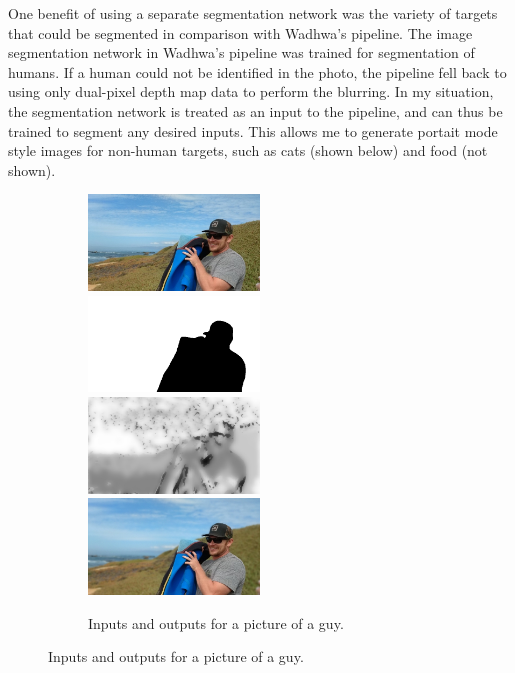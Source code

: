 \documentclass{article}
\begin{document}
One benefit of using a separate segmentation network was the variety of targets that could be segmented in comparison with Wadhwa's
pipeline.
%
The image segmentation network in Wadhwa's pipeline was trained for segmentation of humans.
%
If a human could not be identified in the photo, the pipeline fell back to using only dual-pixel depth map data to perform the
blurring.
%
In my situation, the segmentation network is treated as an input to the pipeline, and can thus be trained to segment any desired
inputs.
%
This allows me to generate portait mode style images for non-human targets, such as cats (shown below) and food (not shown).

\begin{figure}
    \begin{subfigure}{\textwidth}
        \includegraphics[width=0.5\textwidth]{../data/dude-left}
        \includegraphics[width=0.5\textwidth]{../data/dude-seg-clean}
        \includegraphics[width=0.5\textwidth]{../output/dude-depth}
        \includegraphics[width=0.5\textwidth]{../output/dude-portrait}
        \caption{Inputs and outputs for a picture of a guy.}
    \end{subfigure}


\end{figure}
\end{document}
